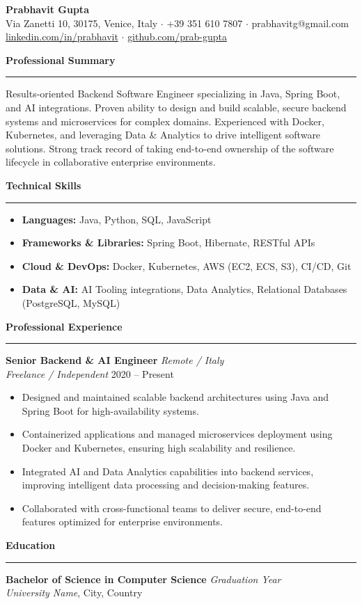 \documentclass[11pt,a4paper]{article}
\begin{document}
\begin{center}
    {\Huge \textbf{Prabhavit Gupta}} \\
    \vspace{2mm}
    Via Zanetti 10, 30175, Venice, Italy $\cdot$ +39 351 610 7807 $\cdot$ prabhavitg@gmail.com \\
    \href{https://www.linkedin.com/in/prabhavit/}{linkedin.com/in/prabhavit} $\cdot$ \href{https://github.com/prab-gupta}{github.com/prab-gupta}
\end{center}

\vspace{5mm}
\noindent \textbf{\Large Professional Summary} \\
\rule{\textwidth}{0.4pt}
Results-oriented Backend Software Engineer specializing in Java, Spring Boot, and AI integrations. Proven ability to design and build scalable, secure backend systems and microservices for complex domains. Experienced with Docker, Kubernetes, and leveraging Data \& Analytics to drive intelligent software solutions. Strong track record of taking end-to-end ownership of the software lifecycle in collaborative enterprise environments.

\vspace{5mm}
\noindent \textbf{\Large Technical Skills} \\
\rule{\textwidth}{0.4pt}
\begin{itemize}[leftmargin=*]
    \item \textbf{Languages:} Java, Python, SQL, JavaScript
    \item \textbf{Frameworks \& Libraries:} Spring Boot, Hibernate, RESTful APIs
    \item \textbf{Cloud \& DevOps:} Docker, Kubernetes, AWS (EC2, ECS, S3), CI/CD, Git
    \item \textbf{Data \& AI:} AI Tooling integrations, Data Analytics, Relational Databases (PostgreSQL, MySQL)
\end{itemize}

\vspace{5mm}
\noindent \textbf{\Large Professional Experience} \\
\rule{\textwidth}{0.4pt}
\textbf{Senior Backend \& AI Engineer} \hfill \textit{Remote / Italy} \\
\textit{Freelance / Independent} \hfill 2020 -- Present
\begin{itemize}[leftmargin=*]
    \item Designed and maintained scalable backend architectures using Java and Spring Boot for high-availability systems.
    \item Containerized applications and managed microservices deployment using Docker and Kubernetes, ensuring high scalability and resilience.
    \item Integrated AI and Data Analytics capabilities into backend services, improving intelligent data processing and decision-making features.
    \item Collaborated with cross-functional teams to deliver secure, end-to-end features optimized for enterprise environments.
\end{itemize}

\vspace{5mm}
\noindent \textbf{\Large Education} \\
\rule{\textwidth}{0.4pt}
\textbf{Bachelor of Science in Computer Science} \hfill \textit{Graduation Year} \\
\textit{University Name}, City, Country
\end{document}
